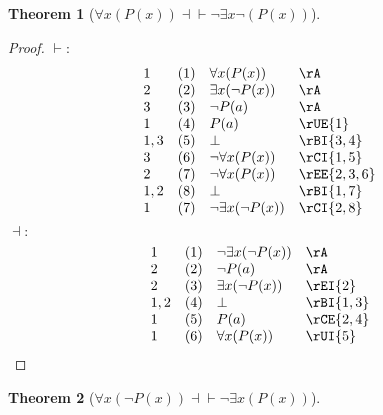\documentclass{book}
\theoremstyle{plain}
\newtheorem{theorem}{Theorem}
\theoremstyle{remark}
\theoremstyle{definition}
\begin{document}
\label{FaxLpPLpxRpRpEqvnExxnLpPLpxRpRp}
\begin{theorem}[\(\forall x(P(x)) \dashv\vdash \neg\exists x \neg(P(x)) \)]
\end{theorem}
\begin{proof}
	\(\vdash:\)
	\[
	\begin{array}{llll}
		1 & (1) & \forall x(P(x)) & \rA \\
		2 & (2) & \exists x(\neg P(x)) & \rA \\
		3 & (3) & \neg P(a) & \rA \\
		1 & (4) & P(a) & \rUE{1} \\
		1,3 & (5) & \bot & \rBI{3,4} \\
		3 & (6) & \neg\forall x(P(x)) & \rCI{1,5} \\
		2 & (7) & \neg\forall x(P(x)) & \rEE{2,3,6} \\
		1,2 & (8) & \bot & \rBI{1,7} \\
		1 & (7) & \neg\exists x(\neg P(x)) & \rCI{2,8} \\
	\end{array}
	\]
	\(\dashv:\)
	\[
	\begin{array}{llll}
		1 & (1) & \neg\exists x(\neg P(x)) & \rA \\
		2 & (2) & \neg P(a) & \rA \\
		2 & (3) & \exists x(\neg P(x)) & \rEI{2} \\
		1,2 & (4) & \bot & \rBI{1,3} \\
		1 & (5) & P(a) & \rCE{2,4} \\
		1 & (6) & \forall x(P(x)) & \rUI{5} \\
	\end{array}
	\]
\end{proof}

\label{FaxLpnPLpxRpRpEqvnExxLpPLpxRpRp}
\begin{theorem}[\(\forall x(\neg P(x)) \dashv\vdash \neg\exists x (P(x))\)]
\end{theorem}
\end{document}
